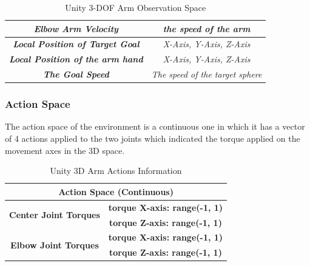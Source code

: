 \begin{table}[!htb]
\begin{tabular}{|c|l|l|c|}
						\multicolumn{3}{|c|}{\textit{\textbf{Elbow Arm Velocity}}}                      & \textit{the speed of the arm}                                                                            \\ \hline
				\multicolumn{3}{|c|}{\textit{\textbf{Local Position of Target Goal}}}      & \textit{X-Axis, Y-Axis, Z-Axis}                                                                          \\ \hline
				\multicolumn{3}{|c|}{\textit{\textbf{Local Position of the arm hand}}}      & \textit{X-Axis, Y-Axis, Z-Axis}                                                                          \\ \hline
				\multicolumn{3}{|c|}{\textit{\textbf{The Goal Speed}}}                         & \textit{The speed of the target sphere}                                                                  \\ \hline
		\end{tabular}
		\caption{Unity 3-DOF Arm Observation Space}
		\label{tab:unity_obs_space}
\end{table}

\subsubsection{Action Space}

The action space of the environment is a continuous one in which it has a vector of 4 actions applied to the two joints which indicated the torque applied on the movement axes in the 3D space.


\begin{table}[!htb]
		\centering

		\begin{tabular}{|c|c|l|l|}
				\hline
				\multicolumn{4}{|c|}{\textbf{Action Space (Continuous)}}                                                    \\ \hline
				\multirow{2}{*}{\textbf{Center Joint Torques}}  & \multicolumn{3}{c|}{\textbf{torque X-axis: range(-1, 1)}} \\ \cline{2-4} 
																										& \multicolumn{3}{c|}{\textbf{torque Z-axis: range(-1, 1)}} \\ \hline
				\multirow{2}{*}{\textbf{Elbow Joint Torques}}   & \multicolumn{3}{c|}{\textbf{torque X-axis: range(-1, 1)}} \\ \cline{2-4} 
																										& \multicolumn{3}{c|}{\textbf{torque Z-axis: range(-1, 1)}} \\ \hline
		\end{tabular}
		\caption{Unity 3D Arm Actions Information}
		\label{tab:unity_arm_actions}

\end{table}

